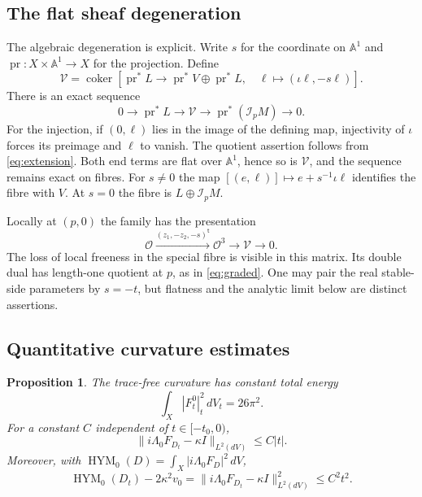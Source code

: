 \documentclass[11pt]{amsart}
\newtheorem{proposition}[theorem]{Proposition}
\theoremstyle{definition}
\theoremstyle{remark}
\newcommand{\cO}{\mathcal O}
\newcommand{\cI}{\mathcal I}
\newcommand{\HYM}{\operatorname{HYM}}
\begin{document}
\subsection{The flat sheaf degeneration}
The algebraic degeneration is explicit. Write $s$ for the coordinate on
$\mathbb A^1$ and $\operatorname{pr}:X\times\mathbb A^1\to X$ for the
projection. Define
\begin{equation}\label{eq:flat-family}
 \mathcal V=\operatorname{coker}
 \left[\operatorname{pr}^*L\longrightarrow
       \operatorname{pr}^*V\oplus\operatorname{pr}^*L,
       \quad\ell\longmapsto(\iota\ell,-s\ell)\right].
\end{equation}
There is an exact sequence
\[
 0\longrightarrow\operatorname{pr}^*L\longrightarrow\mathcal V
 \longrightarrow\operatorname{pr}^*(\cI_pM)\longrightarrow0.
\]
For the injection, if $(0,\ell)$ lies in the image of the defining map,
injectivity of $\iota$ forces its preimage and $\ell$ to vanish. The
quotient assertion follows from \eqref{eq:extension}. Both end terms
are flat over $\mathbb A^1$, hence so is $\mathcal V$, and the sequence
remains exact on fibres. For $s\ne0$ the map
$[(e,\ell)]\mapsto e+s^{-1}\iota\ell$ identifies the fibre with $V$.
At $s=0$ the fibre is $L\oplus\cI_pM$.

Locally at $(p,0)$ the family has the presentation
\[
 \cO\xrightarrow{(z_1,-z_2,-s)^{\mathsf t}}\cO^3
       \longrightarrow\mathcal V\longrightarrow0.
\]
The loss of local freeness in the special fibre is visible in this
matrix. Its double dual has length-one quotient at $p$, as in
\eqref{eq:graded}. One may pair the real stable-side parameters by
$s=-t$, but flatness and the analytic limit below are distinct assertions.

\subsection{Quantitative curvature estimates}
\begin{proposition}\label{prop:stationary-energy}
The trace-free curvature has constant total energy
\begin{equation}\label{eq:energy26}
 \int_X|F_t^0|_t^2\,dV_t=26\pi^2.
\end{equation}
For a constant $C$ independent of $t\in[-t_0,0)$,
\begin{equation}\label{eq:wall-error}
 \|i\Lambda_0F_{D_t}-\kappa I\|_{L^2(dV)}\le C|t|.
\end{equation}
Moreover, with $\HYM_0(D)=\int_X|i\Lambda_0F_D|^2\,dV$,
\begin{equation}\label{eq:excess}
 \HYM_0(D_t)-2\kappa^2v_0
 =\|i\Lambda_0F_{D_t}-\kappa I\|_{L^2(dV)}^2\le C^2t^2.
\end{equation}
\end{proposition}
\end{document}
